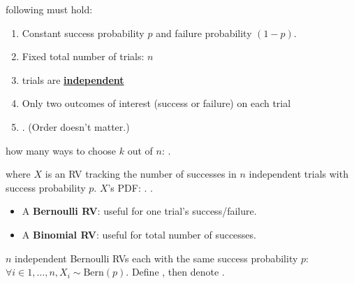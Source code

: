 \documentclass[10pt,landscape]{article}
\newcommand{\Blue}[1]{\noindent{\textbf{\textcolor{Blue}{#1 -}}}}
\newcommand{\Red}[1]{\noindent{\textbf{\textcolor{BrickRed}{#1 -}}}}
\newcommand{\Hint}[1]{\noindent{\textcolor{Orange}{#1}}}
\begin{document}
\begin{multicols}{4}
\Red{Binomial Problems} following must hold:
\begin{enumerate}
    \item Constant success probability $p$ and failure probability $(1-p)$.
    \item Fixed total number of trials: $n$
    \item trials are \underline{\textbf{independent}}
    \item Only two outcomes of interest (success or failure) on each trial
    \item \Hint{Want to find the probability of observing $k$ successes among the total number of $n$ trials}. (Order doesn't matter.)
\end{enumerate}

\Blue{Combination} how many ways to choose $k$ out of $n$: .

\Red{Binomial Distribution}  where $X$ is an RV tracking the number of successes in
$n$ independent trials with success probability $p$. $X$'s PDF:
.
\Hint{Attn: $X$ here is not for one single trial!}.
\begin{itemize}
    \item A \textbf{Bernoulli RV}: useful for one trial's success/failure.
    \item A \textbf{Binomial RV}: useful for total number of successes.
\end{itemize}
\Blue{Binomial as the Sum of Bernoullis} $n$ independent Bernoulli RVs each with the same success probability $p$:
$\forall i \in {1, \dots, n}, X_i \sim \text{Bern}(p)$.
Define , then denote .
\Hint{$\text{Binom}(1, p) = \text{Bern}(p)$}

\end{multicols}
\end{document}
